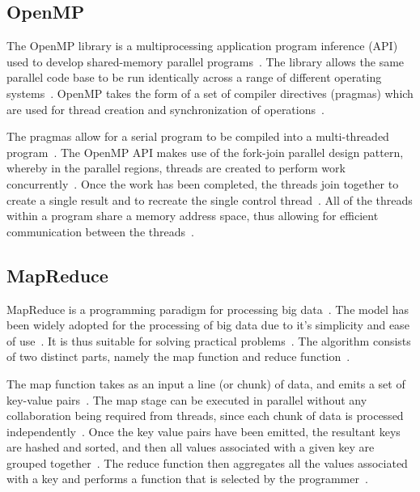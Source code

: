 \documentclass[12pt,twocolumn]{witseiepaper}
\begin{document}
\subsection{OpenMP}

The OpenMP library is a multiprocessing application program inference (API) used to develop shared-memory parallel programs~\cite{comparingMPIMapReduce}. The library allows the same parallel code base to be run identically across a range of different operating systems~\cite{comparingMPIMapReduce}. OpenMP takes the form of a set of compiler directives (pragmas) which are used for thread creation and synchronization of operations~\cite{comparingMPIMapReduce}. 

The pragmas allow for a serial program to be compiled into a multi-threaded program~\cite{kuhn2000openmp}. The OpenMP API makes use of the fork-join parallel design pattern, whereby in the parallel regions, threads are created to perform work concurrently~\cite{openMP}. Once the work has been completed, the threads join together to create a single result and to recreate the single control thread~\cite{openMP}. All of the threads within a program share a memory address space, thus allowing for efficient communication between the threads~\cite{comparingMPIMapReduce}. 

\subsection{MapReduce}

MapReduce is a programming paradigm for processing big data~\cite{comparingMPIMapReduce}. The model has been widely adopted for the processing of big data due to it's simplicity and ease of use~\cite{comparingMPIMapReduce}. It is thus suitable for solving practical problems~\cite{comparingMPIMapReduce, mapReduceJoin}. The algorithm consists of two distinct parts, namely the map function and reduce function~\cite{phoenix}. 

The map function takes as an input a line (or chunk) of data, and emits a set of key-value pairs~\cite{phoenix}. The map stage can be executed in parallel without any collaboration being required from threads, since each chunk of data is processed independently~\cite{comparingMPIMapReduce}. Once the key value pairs have been emitted, the resultant keys are hashed and sorted, and then all values associated with a given key are grouped together~\cite{phoenix}. The reduce function then aggregates all the values associated with a key and performs a function that is selected by the programmer~\cite{comparingMPIMapReduce}.
\end{document}
